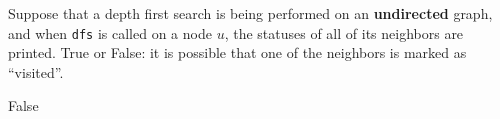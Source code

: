 \begin{prob}

    Suppose that a depth first search is being performed on an
    \textbf{undirected} graph, and when \texttt{dfs} is called on a node $u$,
    the statuses of all of its neighbors are printed. True or False:
    it is possible that one of the neighbors is marked as ``visited''.

    \tF{}

    \begin{soln}
        False
    \end{soln}

\end{prob}

